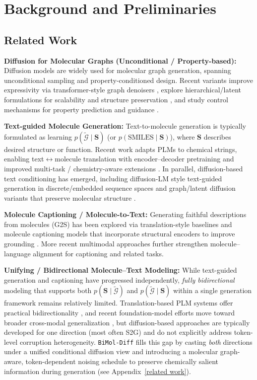 \section{Background and Preliminaries} \label{BRW}

\subsection{Related Work}
\noindent \textbf{Diffusion for Molecular Graphs (Unconditional / Property-based):}
Diffusion models are widely used for molecular graph generation, spanning unconditional sampling and property-conditioned design. Recent variants improve expressivity via transformer-style graph denoisers \citep{liu2024graphdit}, explore hierarchical/latent formulations for scalability and structure preservation \citep{bian2024hglatentdiff}, and study control mechanisms for property prediction and guidance \citep{zhang2025mgdiff}.

\noindent \textbf{Text-guided Molecule Generation:}
Text-to-molecule generation is typically formulated as learning $p(\tilde{\mathcal{G}}\mid \mathbf{S})$ (or $p(\text{SMILES}\mid \mathbf{S})$), where $\mathbf{S}$ describes desired structure or function. Recent work adapts PLMs to chemical strings, enabling text$\leftrightarrow$molecule translation with encoder--decoder pretraining \citep{edwards-etal-2022-translation} and improved multi-task / chemistry-aware extensions \citep{kim2025camt5}. In parallel, diffusion-based text conditioning has emerged, including diffusion-LM style text-guided generation in discrete/embedded sequence spaces \citep{gong2024tgmdlm} and graph/latent diffusion variants that preserve molecular structure \citep{chang2025ldmoltexttomoleculediffusionmodel}.

\noindent \textbf{Molecule Captioning / Molecule-to-Text:}
Generating faithful descriptions from molecules (G2S) has been explored via translation-style baselines \citep{edwards-etal-2022-translation} and molecule captioning models that incorporate structural encoders to improve grounding \citep{liu2024molcamoleculargraphlanguagemodeling}. More recent multimodal approaches further strengthen molecule--language alignment for captioning and related tasks.

\noindent \textbf{Unifying / Bidirectional Molecule--Text Modeling:}
While text-guided generation and captioning have progressed independently, \emph{fully bidirectional} modeling that supports both $p(\mathbf{S}\mid \tilde{\mathcal{G}})$ and $p(\tilde{\mathcal{G}}\mid \mathbf{S})$ within a single generation framework remains relatively limited. Translation-based PLM systems offer practical bidirectionality \citep{edwards-etal-2022-translation}, and recent foundation-model efforts move toward broader cross-modal generalization \citep{liu2024molcamoleculargraphlanguagemodeling}, but diffusion-based approaches are typically developed for one direction (most often S2G) and do not explicitly address token-level corruption heterogeneity. \texttt{BiMol-Diff} fills this gap by casting \emph{both} directions under a unified conditional diffusion view and introducing a molecular graph-aware, token-dependent noising schedule to preserve chemically salient information during generation (see Appendix~\ref{related work}).

